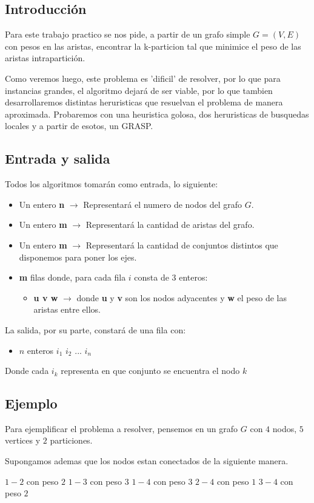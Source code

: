 \subsection{Introducción}

Para este trabajo practico se nos pide, a partir de un grafo simple $G=(V,E)$ con pesos en las aristas, encontrar la k-particion tal que minimice el peso de las aristas intrapartición.

Como veremos luego, este problema es 'dificil' de resolver, por lo que para instancias grandes, el algoritmo dejará de ser viable, por lo que tambien desarrollaremos distintas heruristicas que resuelvan el problema de manera aproximada. Probaremos con una heuristica golosa, dos heruristicas de busquedas locales y a partir de esotos, un GRASP.

\subsection{Entrada y salida}

Todos los algoritmos tomarán como entrada, lo siguiente:

\begin{itemize}
	\item Un entero \textbf{n} $\rightarrow$ Representará el numero de nodos del grafo $G$.

	\item Un entero \textbf{m} $\rightarrow$ Representará la cantidad de aristas del grafo.

	\item Un entero \textbf{m} $\rightarrow$ Representará la cantidad de conjuntos distintos que disponemos para poner los ejes.

	\item \textbf{m} filas donde, para cada fila $i$ consta de $3$ enteros:
	\begin{itemize}
		\item \textbf{u v w} $ \rightarrow $ donde \textbf{u} y \textbf{v} son los nodos adyacentes y \textbf{w} el peso de las aristas entre ellos.
	\end{itemize}
\end{itemize}

La salida, por su parte, constar\'a de una fila con:

\begin{itemize}

\item $n$ enteros $i_1$ $i_2$ $...$ $i_n$

\end{itemize}

Donde cada $i_k$ representa en que conjunto se encuentra el nodo $k$

\subsection{Ejemplo}

Para ejemplificar el problema a resolver, pensemos en un grafo $G$ con $4$ nodos, $5$ vertices y $2$ particiones.

Supongamos ademas que los nodos estan conectados de la siguiente manera.

$1-2$ con peso $2$
$1-3$ con peso $3$
$1-4$ con peso $3$
$2-4$ con peso $1$
$3-4$ con peso $2$
